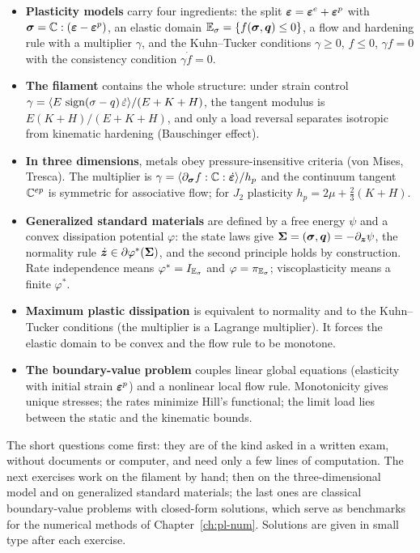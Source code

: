 \begin{gbox*}
\begin{itemize}
  \item \textbf{Plasticity models} carry four ingredients: the split
  $\bm{\varepsilon}=\bm{\varepsilon}^{e}+\bm{\varepsilon}^{p}$ with $\bm{\sigma}=\mathbb{C}:(\bm{\varepsilon}-\bm{\varepsilon}^{p})$, an elastic domain
  $\mathbb{E}_{\sigma}=\{f(\bm{\sigma},\bm{q})\le0\}$, a flow and hardening rule with a multiplier
  $\gamma$, and the Kuhn--Tucker conditions $\gamma\ge0$, $f\le0$, $\gamma f=0$
  with the consistency condition $\gamma\dot f=0$.
  \item \textbf{The filament} contains the whole structure: under strain
  control $\gamma=\langle E\,\operatorname{sign}(\sigma-q)\,\dot\varepsilon\rangle/(E+K+H)$, the
  tangent modulus is $E(K+H)/(E+K+H)$, and only a load reversal separates
  isotropic from kinematic hardening (Bauschinger effect).
  \item \textbf{In three dimensions}, metals obey pressure-insensitive criteria
  (von Mises, Tresca). The multiplier is
  $\gamma=\langle \partial_{\bm{\sigma}}f:\mathbb{C}:\dot{\bm{\varepsilon}}\rangle/h_p$ and the continuum tangent
  $\mathbb{C}^{ep}$ is symmetric for associative flow; for $J_2$ plasticity
  $h_p=2\mu+\tfrac23(K+H)$.
  \item \textbf{Generalized standard materials} are defined by a free energy
  $\psi$ and a convex dissipation potential $\varphi$: the state laws give
  $\bm{\Sigma}=(\bm{\sigma},\bm{q})=-\partial_{\bm{z}}\psi$, the normality rule
  $\dot{\bm{z}}\in\partial\varphi^\ast(\bm{\Sigma})$, and the second principle holds by
  construction. Rate independence means $\varphi^\ast=I_{\mathbb{E}_{\sigma}}$ and
  $\varphi=\pi_{\mathbb{E}_{\sigma}}$; viscoplasticity means a finite $\varphi^\ast$.
  \item \textbf{Maximum plastic dissipation} is equivalent to normality and to
  the Kuhn--Tucker conditions (the multiplier is a Lagrange multiplier). It
  forces the elastic domain to be convex and the flow rule to be monotone.
  \item \textbf{The boundary-value problem} couples linear global equations
  (elasticity with initial strain $\bm{\varepsilon}^{p}$) and a nonlinear local flow rule.
  Monotonicity gives unique stresses; the rates minimize Hill's functional;
  the limit load lies between the static and the kinematic bounds.
\end{itemize}
\end{gbox*}

\label{sec:pl-exo}
The short questions come first: they are of the kind asked in a written
exam, without documents or computer, and need only a few lines of
computation. The next exercises work on the filament by hand; then on the
three-dimensional model and on generalized standard materials; the last ones
are classical boundary-value problems with closed-form solutions, which serve
as benchmarks for the numerical methods of Chapter~\ref{ch:pl-num}. Solutions
are given in small type after each exercise.

